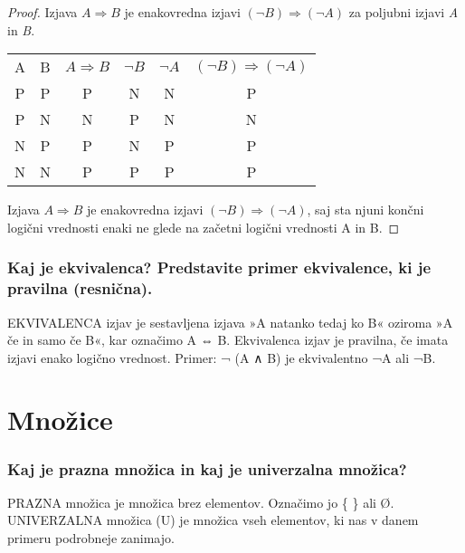 \documentclass{article}
\begin{document}
\begin{proof}
    Izjava $A \Rightarrow B$ je enakovredna izjavi $(\neg B) \Rightarrow (\neg A)$ za poljubni izjavi \emph{A} in \emph{B}.
    \begin{table}[h!]
\begin{tabular}{cccccc}
A & B & $A \Rightarrow B$ & $\neg B$ & $\neg A$ & $(\neg B) \Rightarrow (\neg A)$ \\
P & P & P     & N   & N   & P             \\
P & N & N     & P   & N   & N             \\
N & P & P     & N   & P   & P             \\
N & N & P     & P   & P   & P            
\end{tabular}
    \end{table}
    Izjava $A \Rightarrow B$ je enakovredna izjavi $(\neg B) \Rightarrow (\neg A)$, saj sta njuni končni logični vrednosti enaki ne glede na začetni logični vrednosti A in B.
\end{proof}

\subsubsection*{Kaj je ekvivalenca? Predstavite primer ekvivalence, ki je pravilna (resnična).}
    EKVIVALENCA izjav je sestavljena izjava »A natanko tedaj ko B« oziroma »A če in samo če B«, kar označimo A ⇔ B. Ekvivalenca izjav je pravilna, če imata izjavi enako logično vrednost.
Primer: ¬ (A ∧ B) je ekvivalentno ¬A ali ¬B.


\section{Množice}

\subsubsection*{Kaj je prazna množica in kaj je univerzalna množica? }
PRAZNA množica je množica brez elementov. Označimo jo \{ \} ali Ø.
UNIVERZALNA množica (U) je množica vseh elementov, ki nas v danem primeru
podrobneje zanimajo.
\end{document}
